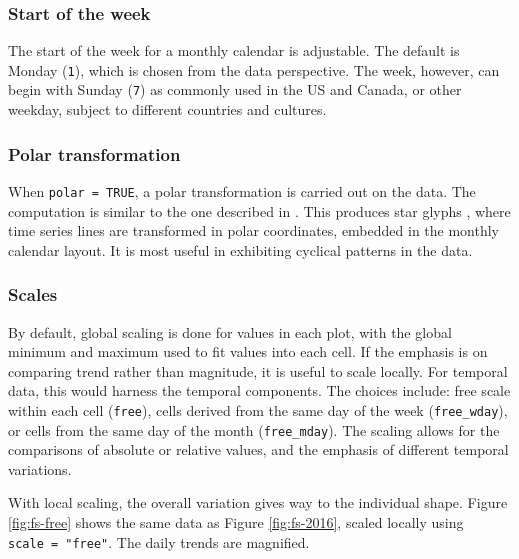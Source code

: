 \documentclass[12pt]{article}
\begin{document}
\hypertarget{start-of-the-week}{%
\subsubsection{Start of the week}\label{start-of-the-week}}

The start of the week for a monthly calendar is adjustable. The default is Monday (\texttt{1}), which is chosen from the data perspective. The week, however, can begin with Sunday (\texttt{7}) as commonly used in the US and Canada, or other weekday, subject to different countries and cultures.

\hypertarget{polar-transformation}{%
\subsubsection{Polar transformation}\label{polar-transformation}}

When \texttt{polar\ =\ TRUE}, a polar transformation is carried out on the data. The computation is similar to the one described in \citet{Wickham2012glyph}. This produces star glyphs \citep{chambers2017graphical}, where time series lines are transformed in polar coordinates, embedded in the monthly calendar layout. It is most useful in exhibiting cyclical patterns in the data.



\hypertarget{scales}{%
\subsubsection{Scales}\label{scales}}

By default, global scaling is done for values in each plot, with the global minimum and maximum used to fit values into each cell. If the emphasis is on comparing trend rather than magnitude, it is useful to scale locally. For temporal data, this would harness the temporal components. The choices include: free scale within each cell (\texttt{free}), cells derived from the same day of the week (\texttt{free\_wday}), or cells from the same day of the month (\texttt{free\_mday}). The scaling allows for the comparisons of absolute or relative values, and the emphasis of different temporal variations.

With local scaling, the overall variation gives way to the individual shape. Figure \ref{fig:fs-free} shows the same data as Figure \ref{fig:fs-2016}, scaled locally using \texttt{scale\ =\ "free"}. The daily trends are magnified.
\end{document}
